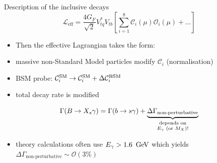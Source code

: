 \documentclass[xcolor=dvipsnames]{beamer}
\begin{document}
\begin{frame}{Description of the inclusive \BtoXsgamma decays}
   \scriptsize
      \begin{equation}\nonumber
         \mathcal{L}_{\mathrm{eff}} = \frac{4G_F}{\sqrt{2}}V_{tq}^*V_{tb}\left[\sum^{8}_{i=1}\mathcal{C}_i(\mu)\mathcal{O}_i(\mu)+ ...\right]
      \end{equation}
   
   \begin{itemize}
      \item[\ra] Then the effective Lagrangian takes the form:
   \end{itemize}
   
   \vspace{-0pt}
   
   
   
   \begin{itemize}
      \item[\ra] massive non-Standard Model particles modify $\mathcal{C}_i$ (normalisation)
      \item[\ra] BSM probe: $      \mathcal{C}_i^{\mathrm{SM}} \rightarrow \mathcal{C}_i^{\mathrm{SM}} + \Delta\mathcal{C}_i^{\mathrm{BSM}}$
      \item[\ra] total decay rate is modified
   \end{itemize}
   
   \vspace{-10pt}
   
   \begin{equation}\nonumber
      \Gamma(B\ra\X_s\g) = \Gamma(b\ra s\g) + \underbrace{\Delta\Gamma_{\text{non-perturbative}}}_{\substack{\text{depends on}\\ \text{\Egamma (or }M_X\text{)!}}}
  \end{equation}

  \begin{itemize}
   \item theory calculations often use ${E_{\gamma}} > 1.6~\mathrm{\,Ge\kern -0.1em V}$  which yields $\Delta\Gamma_{\text{non-perturbative}} \sim \mathcal{O}(3\%)$
  \end{itemize}
  
\end{frame}

\addtocounter{framenumber}{-1}
\end{document}
